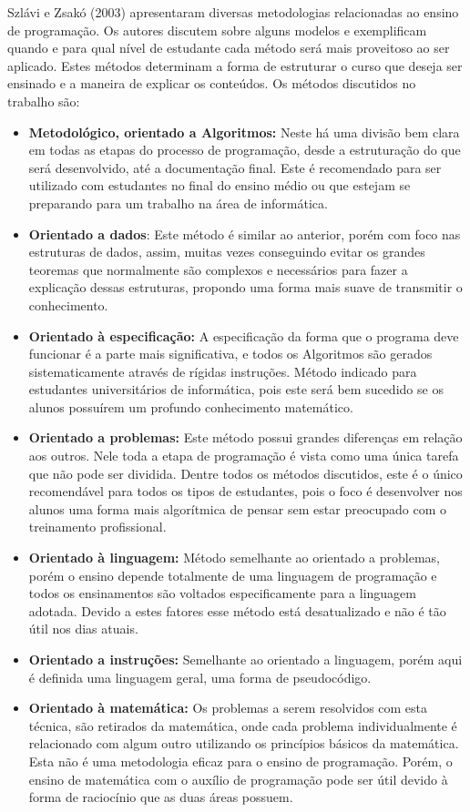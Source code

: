 \nocite{methods}
Szlávi e Zsakó (2003) apresentaram diversas metodologias relacionadas ao ensino de programação. Os autores discutem sobre alguns modelos e exemplificam quando e para qual nível de estudante cada método será mais proveitoso ao ser aplicado. Estes métodos determinam a forma de estruturar o curso que deseja ser ensinado e a maneira de explicar os conteúdos. Os métodos discutidos no trabalho são:

\vspace{-0.1in}
\begin{itemize}[leftmargin=-.001in]
	\itemsep0em
	\item \textbf{Metodológico, orientado a Algoritmos:} Neste há uma divisão bem clara em todas as etapas do processo de programação, desde a estruturação do que será desenvolvido, até a documentação final. Este é recomendado para ser utilizado com estudantes no final do ensino médio ou que estejam se preparando para um trabalho na área de informática.
	\item \textbf{Orientado a dados}: Este método é similar ao anterior, porém com foco nas estruturas de dados, assim, muitas vezes conseguindo evitar os grandes teoremas que normalmente são complexos e necessários para fazer a explicação dessas estruturas, propondo uma forma mais suave de transmitir o conhecimento.
	\item \textbf{Orientado à especificação:} A especificação da forma que o programa deve funcionar é a parte mais significativa, e todos os Algoritmos são gerados sistematicamente através de rígidas instruções. Método indicado para estudantes universitários de informática, pois este será bem sucedido se os alunos possuírem um profundo conhecimento matemático.
	\item \textbf{Orientado a problemas:} Este método possui grandes diferenças em relação aos outros. Nele toda a etapa de programação é vista como uma única tarefa que não pode ser dividida. Dentre todos os métodos discutidos, este é o único recomendável para todos os tipos de estudantes, pois o foco é desenvolver nos alunos uma forma mais algorítmica de pensar sem estar preocupado com o treinamento profissional.
	\item \textbf{Orientado à linguagem:} Método semelhante ao orientado a problemas, porém o ensino depende totalmente de uma linguagem de programação e todos os ensinamentos são voltados especificamente para a linguagem adotada. Devido a estes fatores esse método está desatualizado e não é tão útil nos dias atuais.
	\item \textbf{Orientado a instruções:} Semelhante ao orientado a linguagem, porém aqui é definida uma linguagem geral, uma forma de pseudocódigo.
	\item \textbf{Orientado à matemática:} Os problemas a serem resolvidos com esta técnica, são retirados da matemática, onde cada problema individualmente é relacionado com algum outro utilizando os princípios básicos da matemática. Esta não é uma metodologia eficaz para o ensino de programação. Porém, o ensino de matemática com o auxílio de programação pode ser útil devido à forma de raciocínio que as duas áreas possuem.
\end{itemize}
\vspace{-0.1in}

